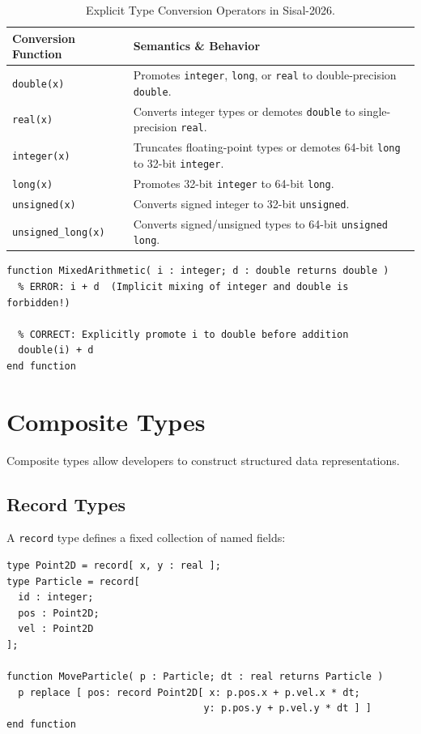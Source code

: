 \begin{table}[h!]
\centering
\begin{tabularx}{\textwidth}{lX}
\toprule
\textbf{Conversion Function} & \textbf{Semantics \& Behavior} \\
\midrule
\texttt{double(x)} & Promotes \texttt{integer}, \texttt{long}, or \texttt{real} to double-precision \texttt{double}. \\
\texttt{real(x)} & Converts integer types or demotes \texttt{double} to single-precision \texttt{real}. \\
\texttt{integer(x)} & Truncates floating-point types or demotes 64-bit \texttt{long} to 32-bit \texttt{integer}. \\
\texttt{long(x)} & Promotes 32-bit \texttt{integer} to 64-bit \texttt{long}. \\
\texttt{unsigned(x)} & Converts signed integer to 32-bit \texttt{unsigned}. \\
\texttt{unsigned\_long(x)} & Converts signed/unsigned types to 64-bit \texttt{unsigned long}. \\
\bottomrule
\end{tabularx}
\caption{Explicit Type Conversion Operators in Sisal-2026.}
\label{tab:type_conversions}
\end{table}

\begin{lstlisting}[caption={Explicit Type Conversion Example}]
function MixedArithmetic( i : integer; d : double returns double )
  % ERROR: i + d  (Implicit mixing of integer and double is forbidden!)
  
  % CORRECT: Explicitly promote i to double before addition
  double(i) + d
end function
\end{lstlisting}

\section{Composite Types}
Composite types allow developers to construct structured data representations.

\subsection{Record Types}
A \texttt{record} type defines a fixed collection of named fields:
\begin{lstlisting}[caption={Record Type Declaration \& Field Access}]
type Point2D = record[ x, y : real ];
type Particle = record[ 
  id : integer; 
  pos : Point2D; 
  vel : Point2D 
];

function MoveParticle( p : Particle; dt : real returns Particle )
  p replace [ pos: record Point2D[ x: p.pos.x + p.vel.x * dt; 
                                  y: p.pos.y + p.vel.y * dt ] ]
end function
\end{lstlisting}

